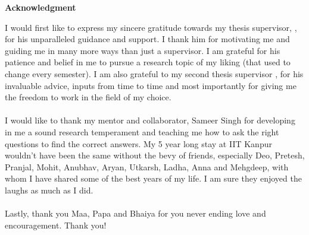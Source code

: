 \begin{center}
	{\huge{\textbf{Acknowledgment}}}
\end{center}
I would first like to express my sincere gratitude towards my thesis supervisor, {\advisormain}, for his unparalleled guidance and support. I thank him for motivating me and guiding me in many more ways than just a supervisor. I am grateful for his patience and belief in me to pursue a research topic of my liking (that used to change every semester). I am also grateful to my second thesis supervisor {\advisorsec}, for his invaluable advice, inputs from time to time and most importantly for giving me the freedom to work in the field of my choice.

\paragraph*{}
I would like to thank my mentor and collaborator, Sameer Singh for developing in me a sound research temperament and teaching me how to ask the right questions to find the correct answers. 
My 5 year long stay at IIT Kanpur wouldn't have been the same without the bevy of friends, especially Deo, Pretesh, Pranjal, Mohit, Anubhav, Aryan, Utkarsh, Ladha, Anna and Mehgdeep, with whom I have shared some of the best years of my life. I am sure they enjoyed the laughs as much as I did.

\paragraph*{}
Lastly, thank you Maa, Papa and Bhaiya for you never ending love and encouragement. Thank you!

\vskip 4mm
\begin{flushright}
\textit{\textbf{\author}}
\end{flushright}




